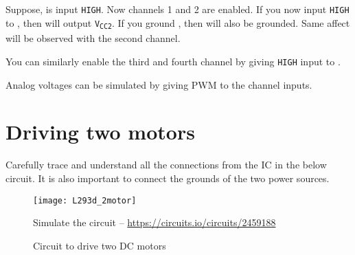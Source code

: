 \documentclass{article}
\begin{document}
	Suppose,  is input \texttt{HIGH}. Now channels 1 and 2 are enabled. If you now input \texttt{HIGH} to , then  will output \texttt{V\textsubscript{CC2}}. If you ground , then  will also be grounded. Same affect will be observed with the second channel.

	You can similarly enable the third and fourth channel by giving \texttt{HIGH} input to .

	Analog voltages can be simulated by giving PWM to the channel inputs.

\newpage
	
\section{Driving two motors}

	Carefully trace and understand all the connections from the IC in the below circuit. It is also important to connect the grounds of the two power sources.

	\begin{figure}[h]
		\centering
		\texttt{[image: L293d\_2motor]}

		Simulate the circuit -- \url{https://circuits.io/circuits/2459188}
		\caption{Circuit to drive two DC motors}
	\end{figure}
\end{document}
